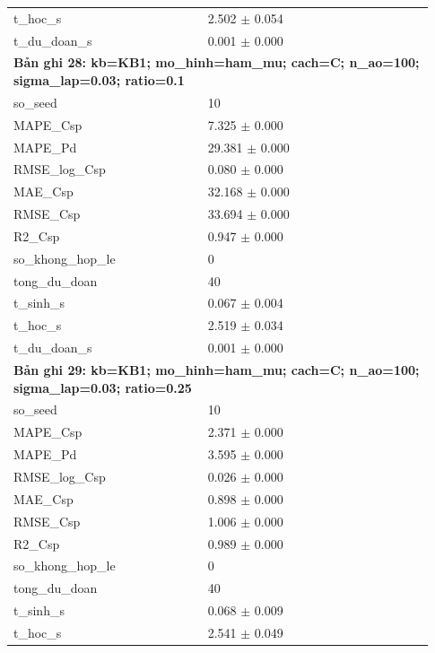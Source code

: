 \begin{longtable}{p{0.43\linewidth}p{0.50\linewidth}}
t\_\allowbreak hoc\_\allowbreak s & 2.502 $\pm$ 0.054 \\
t\_\allowbreak du\_\allowbreak doan\_\allowbreak s & 0.001 $\pm$ 0.000 \\
\midrule
\multicolumn{2}{p{0.95\linewidth}}{\textbf{Bản ghi 28: kb=KB1; mo\_hinh=ham\_mu; cach=C; n\_ao=100; sigma\_lap=0.03; ratio=0.1}} \\
so\_\allowbreak seed & 10 \\
MAPE\_\allowbreak Csp & 7.325 $\pm$ 0.000 \\
MAPE\_\allowbreak Pd & 29.381 $\pm$ 0.000 \\
RMSE\_\allowbreak log\_\allowbreak Csp & 0.080 $\pm$ 0.000 \\
MAE\_\allowbreak Csp & 32.168 $\pm$ 0.000 \\
RMSE\_\allowbreak Csp & 33.694 $\pm$ 0.000 \\
R2\_\allowbreak Csp & 0.947 $\pm$ 0.000 \\
so\_\allowbreak khong\_\allowbreak hop\_\allowbreak le & 0 \\
tong\_\allowbreak du\_\allowbreak doan & 40 \\
t\_\allowbreak sinh\_\allowbreak s & 0.067 $\pm$ 0.004 \\
t\_\allowbreak hoc\_\allowbreak s & 2.519 $\pm$ 0.034 \\
t\_\allowbreak du\_\allowbreak doan\_\allowbreak s & 0.001 $\pm$ 0.000 \\
\midrule
\multicolumn{2}{p{0.95\linewidth}}{\textbf{Bản ghi 29: kb=KB1; mo\_hinh=ham\_mu; cach=C; n\_ao=100; sigma\_lap=0.03; ratio=0.25}} \\
so\_\allowbreak seed & 10 \\
MAPE\_\allowbreak Csp & 2.371 $\pm$ 0.000 \\
MAPE\_\allowbreak Pd & 3.595 $\pm$ 0.000 \\
RMSE\_\allowbreak log\_\allowbreak Csp & 0.026 $\pm$ 0.000 \\
MAE\_\allowbreak Csp & 0.898 $\pm$ 0.000 \\
RMSE\_\allowbreak Csp & 1.006 $\pm$ 0.000 \\
R2\_\allowbreak Csp & 0.989 $\pm$ 0.000 \\
so\_\allowbreak khong\_\allowbreak hop\_\allowbreak le & 0 \\
tong\_\allowbreak du\_\allowbreak doan & 40 \\
t\_\allowbreak sinh\_\allowbreak s & 0.068 $\pm$ 0.009 \\
t\_\allowbreak hoc\_\allowbreak s & 2.541 $\pm$ 0.049 \\

\end{longtable}
